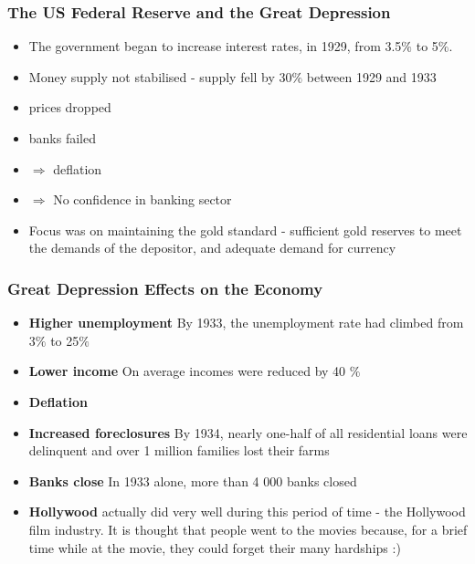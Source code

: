 \documentclass[11pt]{beamer}
\begin{document}
\begin{frame}
\frametitle{The US Federal Reserve and the Great Depression}

\begin{itemize}
\item The government began to increase interest rates, in 1929, from 3.5$\%$ to 5$\%$.
\item Money supply not stabilised - supply fell by 30$\%$ between 1929 and 1933
\item prices dropped
\item banks failed
\item $\Rightarrow$ deflation
\item $\Rightarrow$ No confidence in banking sector
\item Focus was on maintaining the gold standard - sufficient gold reserves to meet the demands of the depositor, and adequate demand for currency

\end{itemize}


\end{frame}

\begin{frame}
\frametitle{Great Depression Effects on the Economy}
\begin{itemize}
\item \textbf{Higher unemployment} By 1933, the unemployment rate had climbed from 3$\%$ to 25$\%$
\item \textbf{Lower income} On average incomes were reduced by 40 $\%$
\item \textbf{Deflation}
\item \textbf{Increased foreclosures} By 1934, nearly one-half of all residential loans were delinquent and over 1 million families lost their farms
\item \textbf{Banks close} In 1933 alone, more than 4 000 banks closed
\item \textbf{Hollywood} actually did very well during this period of time - the Hollywood film industry. It is thought that people went to the movies because, for a brief time while at the movie, they could forget their many hardships :)

\end{itemize}
\end{frame}
\end{document}
